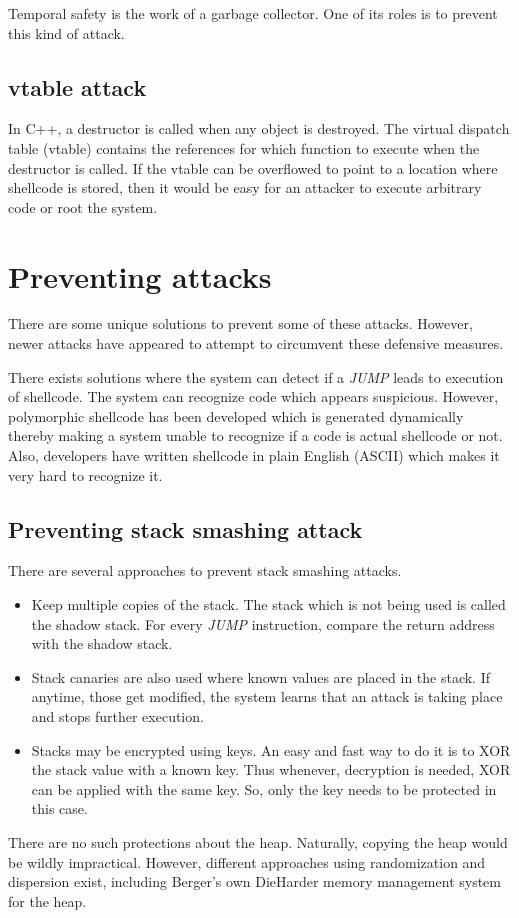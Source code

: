 \documentclass[twoside]{article}
\begin{document}


Temporal safety is the work of a garbage collector. One of its roles is to prevent this kind of attack.

\subsection{vtable attack}
In C++, a destructor is called when any object is destroyed. The virtual dispatch table (vtable) contains the references for which function to execute when the destructor is called. If the vtable can be overflowed to point to a location where shellcode is stored, then it would be easy for an attacker to execute arbitrary code or root the system.

\section{Preventing attacks}
There are some unique solutions to prevent some of these attacks. However, newer attacks have appeared to attempt to circumvent these defensive measures.

There exists solutions where the system can detect if a \textit{JUMP} leads to execution of shellcode. The system can recognize code which appears suspicious. However, polymorphic shellcode has been developed which is generated dynamically thereby making a system unable to recognize if a code is actual shellcode or not. Also, developers have written shellcode in plain English (ASCII) which makes it very hard to recognize it.

\subsection{Preventing stack smashing attack}
There are several approaches to prevent stack smashing attacks.

\begin{itemize}
	\item Keep multiple copies of the stack. The stack which is not being used is called the shadow stack. For every \textit{JUMP} instruction, compare the return address with the shadow stack.
	\item Stack canaries are also used where known values are placed in the stack. If anytime, those get modified, the system learns that an attack is taking place and stops further execution.
	\item Stacks may be encrypted using keys. An easy and fast way to do it is to XOR the stack value with a known key. Thus whenever, decryption is needed, XOR can be applied with the same key. So, only the key needs to be protected in this case.
\end{itemize}
There are no such protections about the heap. Naturally, copying the heap would be wildly impractical. However, different approaches using randomization and dispersion exist, including Berger's own DieHarder memory management system for the heap.
\end{document}
